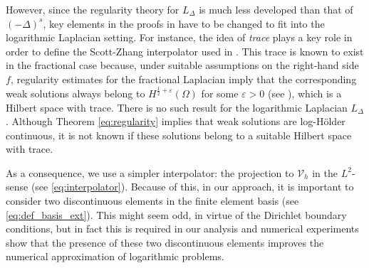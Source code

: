 \documentclass[10 pt]{article}
\numberwithin{equation}{section}
\def\eps{\varepsilon}
\begin{document}
 However, since the regularity theory for $L_\Delta$ is much less developed than that of $(-\Delta)^s$, key elements in the proofs in \cite{Bor17} have to be changed to fit into the logarithmic Laplacian setting.  For instance, the idea of \emph{trace} plays a key role in order to define the Scott-Zhang interpolator used in \cite{Bor17}. This trace is known to exist in the fractional case because, under suitable assumptions on the right-hand side $f$, regularity estimates for the fractional Laplacian imply that the corresponding weak solutions always belong to $H^{\frac{1}{2}+\eps}(\Omega)$ for some $\eps>0$ (see \cite[Theorem 2.3.6]{Bor17}), which is a Hilbert space with trace.  There is no such result for the logarithmic Laplacian $L_\Delta$.  Although Theorem \ref{eq:regularity} implies that weak solutions are log-Hölder continuous, it is not known if these solutions belong to a suitable Hilbert space with trace.

 As a consequence, we use a simpler interpolator: the projection to $\mathcal V_h$ in the $L^2$-sense (see \eqref{eq:interpolator}). Because of this, in our approach, it is important to consider two discontinuous elements in the finite element basis (see \eqref{eq:def_basis_ext}).  This might seem odd, in virtue of the Dirichlet boundary conditions, but in fact this is required in our analysis and numerical experiments show that the presence of these two discontinuous elements improves the numerical approximation of logarithmic problems.
\end{document}
